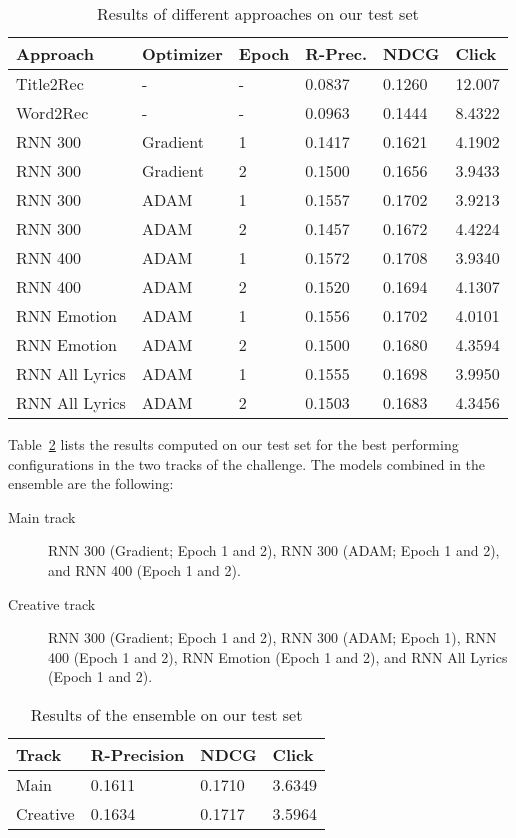 \begin{table}
\begin{tabular}{@{}llllll@{}}
\toprule
Approach    & Optimizer & Epoch & R-Prec.     & NDCG   & Click   \\ \midrule
Title2Rec   & -         & -     & 0.0837      & 0.1260 & 12.007  \\
Word2Rec    & -         & -     & 0.0963      & 0.1444 & 8.4322  \\
RNN 300     & Gradient  & 1     & 0.1417      & 0.1621 & 4.1902  \\
RNN 300     & Gradient  & 2     & 0.1500      & 0.1656 & 3.9433  \\
RNN 300     & ADAM      & 1     & 0.1557      & 0.1702 & 3.9213  \\
RNN 300     & ADAM      & 2     & 0.1457      & 0.1672 & 4.4224  \\
RNN 400     & ADAM      & 1     & 0.1572      & 0.1708 & 3.9340  \\
RNN 400     & ADAM      & 2     & 0.1520      & 0.1694 & 4.1307  \\
RNN Emotion & ADAM      & 1     & 0.1556      & 0.1702 & 4.0101  \\
RNN Emotion & ADAM      & 2     & 0.1500      & 0.1680 & 4.3594  \\
RNN All Lyrics   & ADAM      & 1     & 0.1555      & 0.1698 & 3.9950  \\
RNN All Lyrics   & ADAM      & 2     & 0.1503      & 0.1683 & 4.3456  \\ \bottomrule
\end{tabular}
\caption{Results of different approaches on our test set}
\label{tab:approaches}
\end{table}

Table~\ref{tab:ensemble} lists the results computed on our test set for the best performing configurations in the two tracks of the challenge. The models combined in the ensemble are the following:
\begin{description}
 \item[Main track] RNN 300 (Gradient; Epoch 1 and 2), RNN 300 (ADAM; Epoch 1 and 2), and RNN 400 (Epoch 1 and 2).
 \item[Creative track] RNN 300 (Gradient; Epoch 1 and 2), RNN 300 (ADAM; Epoch 1), RNN 400 (Epoch 1 and 2), RNN Emotion (Epoch 1 and 2), and RNN All Lyrics (Epoch 1 and 2).
\end{description}

\begin{table}
\begin{tabular}{@{}llll@{}}
\toprule
Track    & R-Precision & NDCG   & Click  \\ \midrule
Main     & 0.1611      & 0.1710 & 3.6349 \\
Creative & 0.1634      & 0.1717 & 3.5964 \\ \bottomrule
\end{tabular}
\caption{Results of the ensemble on our test set}
\label{tab:ensemble}
\end{table}